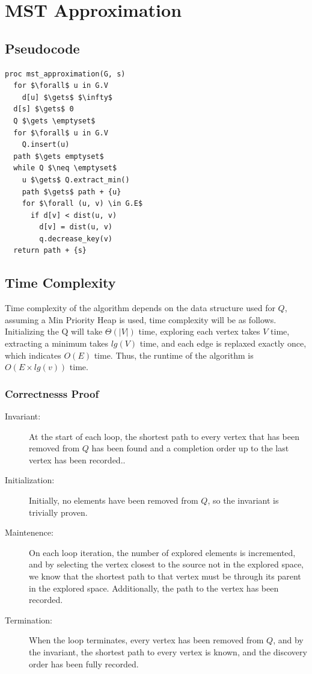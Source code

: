 \documentclass[a4paper,12pt]{article}
\begin{document}
\section{MST Approximation}
\subsection{Pseudocode}
\begin{lstlisting}[mathescape=true]
proc mst_approximation(G, s)
  for $\forall$ u in G.V
    d[u] $\gets$ $\infty$
  d[s] $\gets$ 0
  Q $\gets \emptyset$
  for $\forall$ u in G.V
    Q.insert(u)
  path $\gets emptyset$
  while Q $\neq \emptyset$
    u $\gets$ Q.extract_min()
    path $\gets$ path + {u}
    for $\forall (u, v) \in G.E$
      if d[v] < dist(u, v)
        d[v] = dist(u, v)
        q.decrease_key(v)
  return path + {s}
\end{lstlisting}
\subsection{Time Complexity}
Time complexity of the algorithm depends on the data structure used for $Q$, assuming a Min Priority Heap is used, time complexity will be as follows. Initializing the Q will take $\Theta(|V|)$ time, exploring each vertex takes $V$ time, extracting a minimum takes $lg(V)$ time, and each edge is replaxed exactly once, which indicates $O(E)$ time. Thus, the runtime of the algorithm is $O(E \times lg(v))$ time.
\subsubsection{Correctnesss Proof}
\begin{description}
\item [Invariant: ] At the start of each loop, the shortest path to every vertex that has been removed from $Q$ has been found and a completion order up to the last vertex has been recorded..
\item [Initialization: ] Initially, no elements have been removed from $Q$, so the invariant is trivially proven.
\item [Maintenence: ] On each loop iteration, the number of explored elements is incremented, and by selecting the vertex closest to the source not in the explored space, we know that the shortest path to that vertex must be through its parent in the explored space. Additionally, the path to the vertex has been recorded.
\item [Termination: ] When the loop terminates, every vertex has been removed from $Q$, and by the invariant, the shortest path to every vertex is known, and the discovery order has been fully recorded.
\end{description}
\end{document}

